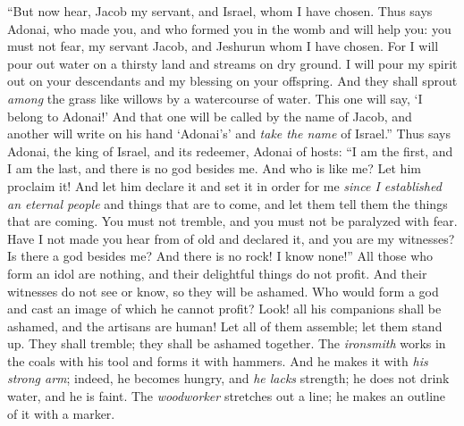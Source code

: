 \begin{biblechapter} %
 “But now hear, Jacob my servant, 
and Israel, whom I have chosen.
\verse Thus says Adonai, who made you, 
and who formed you in the womb and will help you: 
you must not fear, my servant Jacob, 
and Jeshurun whom I have chosen.
\verse For I will pour out water on a thirsty land 
and streams on dry ground. 
I will pour my spirit out on your descendants 
and my blessing on your offspring.
\verse And they shall sprout \textit{among} the grass 
like willows by a watercourse of water.
\verse This one will say, ‘I belong to Adonai!’ 
And that one will be called by the name of Jacob, 
and another will write on his hand ‘Adonai’s’ 
and \textit{take the name} of Israel.”
 Thus says Adonai, the king of Israel, 
and its redeemer, Adonai of hosts: 
“I am the first, and I am the last, 
and there is no god besides me.
\verse And who is like me? Let him proclaim it! 
And let him declare it and set it in order for me 
\textit{since I established an eternal people} and things that are to come, 
and let them tell them the things that are coming.
\verse You must not tremble, 
and you must not be paralyzed with fear. 
Have I not made you hear from of old 
and declared it, and you are my witnesses? 
Is there a god besides me? 
And there is no rock! I know none!”
 All those who form an idol are nothing, 
and their delightful things do not profit. 
And their witnesses do not see or know, 
so they will be ashamed.
\verse Who would form a god 
and cast an image of which he cannot profit?
\verse Look! all his companions shall be ashamed, 
and the artisans are human! 
Let all of them assemble; 
let them stand up. 
They shall tremble; 
they shall be ashamed together.
\verse The \textit{ironsmith} works in the coals with his tool 
and forms it with hammers. 
And he makes it with \textit{his strong arm}; 
indeed, he becomes hungry, and \textit{he lacks} strength; 
he does not drink water, and he is faint.
\verse The \textit{woodworker} stretches out a line; 
he makes an outline of it with a marker. 

\end{biblechapter}
